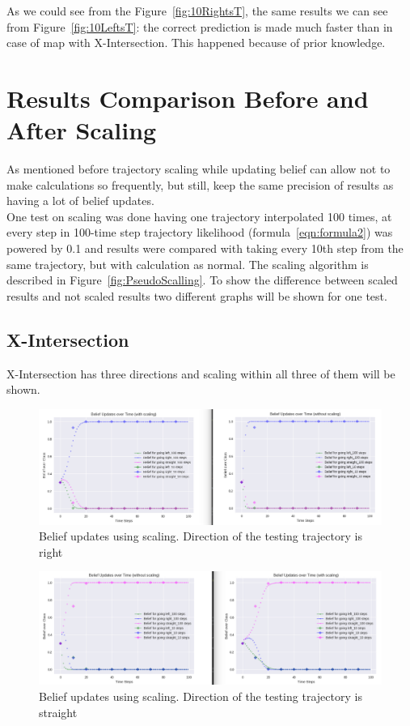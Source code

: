 As we could see from the Figure~\ref{fig:10RightsT}, the same results we can see from Figure~\ref{fig:10LeftsT}: the correct prediction is made much faster than in case of map with X-Intersection. This happened because of prior knowledge.

\section{Results Comparison Before and After Scaling}

 As mentioned before trajectory scaling while updating belief can allow not to make calculations so frequently, but still, keep the same precision of results as having a lot of belief updates. \\
 
 One test on scaling was done having one trajectory interpolated 100 times, at every step in 100-time step trajectory likelihood (formula~\ref{eqn:formula2}) was powered by 0.1 and results were compared with taking every 10th step from the same trajectory, but with calculation as normal. The scaling algorithm is described in Figure~\ref{fig:PseudoScalling}. To show the difference between scaled results and not scaled results two different graphs will be shown for one test.

\subsection{X-Intersection}

X-Intersection has three directions and scaling within all three of them will be shown.

\begin{figure}[H]
	\centering  	
	\includegraphics[width=15cm]{img/Scaling_Right_X.jpg}
	\caption{Belief updates using scaling. Direction of the testing trajectory is right}
	\label{fig:ScallingRightX}    
\end{figure}

\begin{figure}[H]
	\centering  	
	\includegraphics[width=15cm]{img/Scaling_Straight_X.jpg}
	\caption{Belief updates using scaling. Direction of the testing trajectory is straight}
	\label{fig:ScallingStraightX}    
\end{figure}

